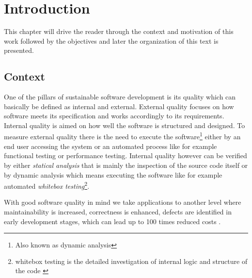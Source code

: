 \chapter{Introduction}
 This chapter will drive the reader through the context and motivation of this work followed by the objectives and later the organization of this text is presented.  
 

\section{Context}

One of the pillars of sustainable software development is its quality which can basically be defined as internal and external. External quality focuses on how software meets its specification and works accordingly to its requirements. Internal quality is aimed on how well the software is structured and designed. To measure external quality there is the need to execute the software\footnote{Also known as dynamic analysis} either by an end user accessing the system or an automated process like for example functional testing or performance testing. Internal quality however can be verified by either \emph{statical analysis} that is mainly the inspection of the source code itself or by dynamic analysis which means executing the software like for example automated \emph{whitebox testing}\footnote{whitebox testing is the detailed investigation of internal logic and structure of the code \citep{Khan 2012}}.   

With good software quality in mind we take applications to another level where maintainability is increased, correctness is enhanced, defects are identified in early development stages, which can lead up to 100 times reduced costs \citep{Beohm 2001}.

